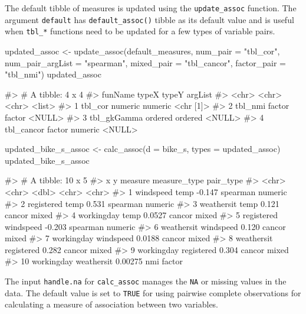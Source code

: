 The default tibble of measures is updated using the
\texttt{update\_assoc} function. The argument \texttt{default} has
\texttt{default\_assoc()} tibble as its default value and is useful when
\texttt{tbl\_*} functions need to be updated for a few types of variable
pairs.

\begin{Schunk}
\begin{Sinput}
updated_assoc <- update_assoc(default_measures,
                              num_pair = "tbl_cor",
                              num_pair_argList = "spearman",
                              mixed_pair = "tbl_cancor",
                              factor_pair = "tbl_nmi")
updated_assoc
\end{Sinput}
\begin{Soutput}
#> # A tibble: 4 x 4
#>   funName     typeX   typeY   argList  
#>   <chr>       <chr>   <chr>   <list>   
#> 1 tbl_cor     numeric numeric <chr [1]>
#> 2 tbl_nmi     factor  factor  <NULL>   
#> 3 tbl_gkGamma ordered ordered <NULL>   
#> 4 tbl_cancor  factor  numeric <NULL>
\end{Soutput}
\begin{Sinput}
updated_bike_s_assoc <- calc_assoc(d = bike_s, 
                                 types = updated_assoc)
updated_bike_s_assoc
\end{Sinput}
\begin{Soutput}
#> # A tibble: 10 x 5
#>    x          y           measure measure_type pair_type
#>    <chr>      <chr>         <dbl> <chr>        <chr>    
#>  1 windspeed  temp       -0.147   spearman     numeric  
#>  2 registered temp        0.531   spearman     numeric  
#>  3 weathersit temp        0.121   cancor       mixed    
#>  4 workingday temp        0.0527  cancor       mixed    
#>  5 registered windspeed  -0.203   spearman     numeric  
#>  6 weathersit windspeed   0.120   cancor       mixed    
#>  7 workingday windspeed   0.0188  cancor       mixed    
#>  8 weathersit registered  0.282   cancor       mixed    
#>  9 workingday registered  0.304   cancor       mixed    
#> 10 workingday weathersit  0.00275 nmi          factor
\end{Soutput}
\end{Schunk}

The input \texttt{handle.na} for \texttt{calc\_assoc} manages the
\texttt{NA} or missing values in the data. The default value is set to
\texttt{TRUE} for using pairwise complete observations for calculating a
measure of association between two variables.

